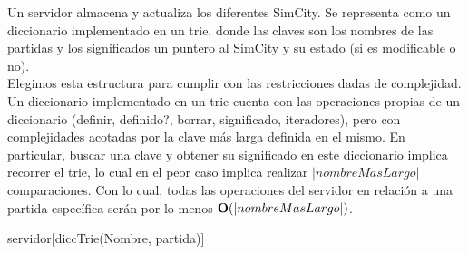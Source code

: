 \begin{Representacion}
  
  
    Un servidor almacena y actualiza los diferentes SimCity. Se representa como un 
    diccionario implementado en un trie, donde las claves son los nombres de las partidas
    y los significados un puntero al SimCity y su estado (si es modificable o no).\\

    Elegimos esta estructura para cumplir con las restricciones dadas de complejidad. Un diccionario implementado en un trie cuenta con
    las operaciones propias de un diccionario (definir, definido?, borrar, significado, iteradores), pero con complejidades acotadas por la 
    clave más larga definida en el mismo. En particular, buscar una clave y obtener su significado en este diccionario implica recorrer
    el trie, lo cual en el peor caso implica realizar $|nombreMasLargo|$ comparaciones. Con lo cual, todas las operaciones del servidor 
    en relación a una partida específica serán por lo menos $\bold{O}(|nombreMasLargo|)$.

    

    \begin{Estructura}{servidor}[diccTrie(Nombre, partida)]
        \begin{Tupla}[partida]
        \end{Tupla}

    \end{Estructura}
    
    \vspace{2mm}
    \vspace{2mm}

    ~
    

\end{Representacion}
